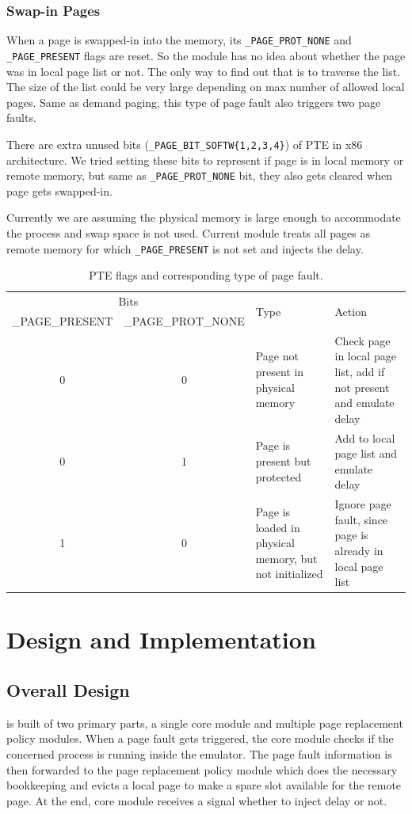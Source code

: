 \subsection{Swap-in Pages}
When a page is swapped-in into the memory, its \verb|_PAGE_PROT_NONE| and \verb|_PAGE_PRESENT| flags are reset. So the module has no idea about whether the page was in local page list or not. The only way to find out that is to traverse the list. The size of the list could be very large depending on max number of allowed local pages. Same as demand paging, this type of page fault also triggers two page faults.

There are extra unused bits (\verb|_PAGE_BIT_SOFTW{1,2,3,4}|) of PTE in x86 architecture. We tried setting these bits to represent if page is in local memory or remote memory, but same as \verb|_PAGE_PROT_NONE| bit, they also gets cleared when page gets swapped-in.

Currently we are assuming the physical memory is large enough to accommodate the process and swap space is not used. Current module treats all pages as remote memory for which \verb|_PAGE_PRESENT| is not set and injects the delay.


\begin{table}[tbp]
	\centering
	\caption{PTE flags and corresponding type of page fault.}
	\label{tab:pte_flags_vs_type} 
	\begin{tabular}{cc|p{}|p{}}
		\toprule 
		\multicolumn{2}{c|}{Bits} &  
		\multirow{2}{*}{Type} & \multirow{2}{*}{Action} \\
		\_PAGE\_PRESENT& \_PAGE\_PROT\_NONE & &     \\
		\midrule	
		0 & 0 &  Page not present in physical memory & 
		Check page in local page list, add if not present and emulate delay		
		\\ \hline		
		0 & 1 &  
		Page is present but protected 		&  
		Add to local page list and emulate delay \\ 
		\hline	
		1   & 0     & Page is loaded in physical memory, but not initialized & Ignore page fault, since page is already in local page list
	\end{tabular}
\end{table}


\chapter{Design and Implementation}

\section{Overall Design}
{\dime} is built of two primary parts, a single core module and multiple page replacement policy modules. When a page fault gets triggered, the core module checks if the concerned process is running inside the emulator. The page fault information is then forwarded to the page replacement policy module which does the necessary bookkeeping and evicts a local page to make a spare slot available for the remote page. At the end, core module receives a signal whether to inject delay or not.

